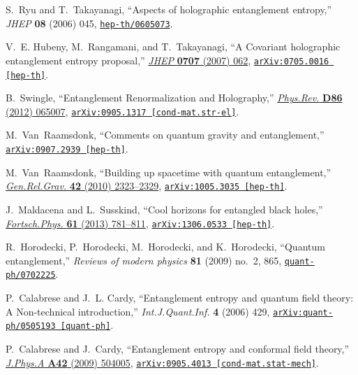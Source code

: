\begin{thebibliography}{100}
S.~Ryu and T.~Takayanagi, ``Aspects of holographic entanglement entropy,'' {\em
  JHEP} {\bf 08} (2006)  045,
\href{http://arxiv.org/abs/hep-th/0605073}{{\tt hep-th/0605073}}.

V.~E. Hubeny, M.~Rangamani, and T.~Takayanagi, ``{A Covariant holographic
  entanglement entropy proposal},''
  \href{http://dx.doi.org/10.1088/1126-6708/2007/07/062}{{\em JHEP} {\bf 0707}
  (2007)  062},
\href{http://arxiv.org/abs/0705.0016}{{\tt arXiv:0705.0016 [hep-th]}}.

B.~Swingle, ``{Entanglement Renormalization and Holography},''
  \href{http://dx.doi.org/10.1103/PhysRevD.86.065007}{{\em Phys.Rev.} {\bf D86}
  (2012)  065007},
\href{http://arxiv.org/abs/0905.1317}{{\tt arXiv:0905.1317 [cond-mat.str-el]}}.

M.~Van~Raamsdonk, ``{Comments on quantum gravity and entanglement},''
\href{http://arxiv.org/abs/0907.2939}{{\tt arXiv:0907.2939 [hep-th]}}.

M.~Van~Raamsdonk, ``{Building up spacetime with quantum entanglement},''
  \href{http://dx.doi.org/10.1007/s10714-010-1034-0,
  10.1142/S0218271810018529}{{\em Gen.Rel.Grav.} {\bf 42} (2010)  2323--2329},
\href{http://arxiv.org/abs/1005.3035}{{\tt arXiv:1005.3035 [hep-th]}}.

J.~Maldacena and L.~Susskind, ``{Cool horizons for entangled black holes},''
  \href{http://dx.doi.org/10.1002/prop.201300020}{{\em Fortsch.Phys.} {\bf 61}
  (2013)  781--811},
\href{http://arxiv.org/abs/1306.0533}{{\tt arXiv:1306.0533 [hep-th]}}.

R.~Horodecki, P.~Horodecki, M.~Horodecki, and K.~Horodecki, ``Quantum
  entanglement,'' {\em Reviews of modern physics} {\bf 81} (2009) no.~2, 865,
  \href{http://arxiv.org/abs/quant-ph/0702225}{{\tt quant-ph/0702225}}.

P.~Calabrese and J.~L. Cardy, ``{Entanglement entropy and quantum field theory:
  A Non-technical introduction},'' {\em Int.J.Quant.Inf.} {\bf 4} (2006)  429,
\href{http://arxiv.org/abs/quant-ph/0505193}{{\tt arXiv:quant-ph/0505193
  [quant-ph]}}.

P.~Calabrese and J.~Cardy, ``{Entanglement entropy and conformal field
  theory},'' \href{http://dx.doi.org/10.1088/1751-8113/42/50/504005}{{\em
  J.Phys.A} {\bf A42} (2009)  504005},
\href{http://arxiv.org/abs/0905.4013}{{\tt arXiv:0905.4013
  [cond-mat.stat-mech]}}.


\end{thebibliography}

